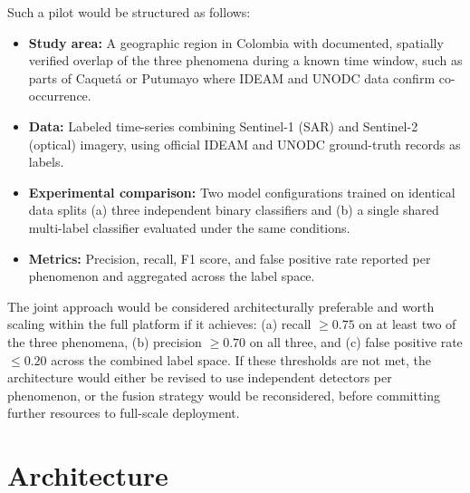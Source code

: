 \documentclass{article}
\begin{document}
Such a pilot would be structured as follows:
\begin{itemize}
    \item \textbf{Study area:} A geographic region in Colombia with
    documented, spatially verified overlap of the three phenomena during
    a known time window, such as parts of Caquetá or Putumayo where
    IDEAM and UNODC data confirm co-occurrence.
    \item \textbf{Data:} Labeled time-series combining Sentinel-1 (SAR)
    and Sentinel-2 (optical) imagery, using official IDEAM and UNODC
    ground-truth records as labels.
    \item \textbf{Experimental comparison:} Two model configurations trained
    on identical data splits (a) three independent binary classifiers and
    (b) a single shared multi-label classifier evaluated under the same
    conditions.
    \item \textbf{Metrics:} Precision, recall, F1 score, and false positive
    rate reported per phenomenon and aggregated across the label space.
\end{itemize}

The joint approach would be considered architecturally preferable and
worth scaling within the full platform if it achieves: (a) recall
$\geq 0.75$ on at least two of the three phenomena, (b) precision
$\geq 0.70$ on all three, and (c) false positive rate $\leq 0.20$
across the combined label space.
If these thresholds are not met, the architecture would either be revised
to use independent detectors per phenomenon, or the fusion strategy would
be reconsidered, before committing further resources to full-scale
deployment.


\section{Architecture}
\label{sec:architecture}

\end{document}
